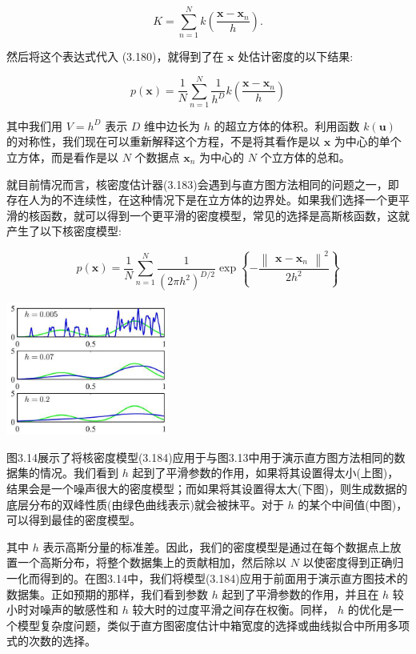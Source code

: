 \documentclass[10pt]{article}
\begin{document}
\[
K = \mathop{\sum }\limits_{{n = 1}}^{N}k\left( \frac{\mathbf{x} - {\mathbf{x}}_{n}}{h}\right) . \tag{3.182}
\]

然后将这个表达式代入 (3.180)，就得到了在 \(\mathbf{x}\) 处估计密度的以下结果:

\[
p\left( \mathbf{x}\right)  = \frac{1}{N}\mathop{\sum }\limits_{{n = 1}}^{N}\frac{1}{{h}^{D}}k\left( \frac{\mathbf{x} - {\mathbf{x}}_{n}}{h}\right)  \tag{3.183}
\]

其中我们用 \(V = {h}^{D}\) 表示 \(D\) 维中边长为 \(h\) 的超立方体的体积。利用函数 \(k\left( \mathbf{u}\right)\) 的对称性，我们现在可以重新解释这个方程，不是将其看作是以 \(\mathbf{x}\) 为中心的单个立方体，而是看作是以 \(N\) 个数据点 \({\mathbf{x}}_{n}\) 为中心的 \(N\) 个立方体的总和。

就目前情况而言，核密度估计器(3.183)会遇到与直方图方法相同的问题之一，即存在人为的不连续性，在这种情况下是在立方体的边界处。如果我们选择一个更平滑的核函数，就可以得到一个更平滑的密度模型，常见的选择是高斯核函数，这就产生了以下核密度模型:

\[
p\left( \mathbf{x}\right)  = \frac{1}{N}\mathop{\sum }\limits_{{n = 1}}^{N}\frac{1}{{\left( 2\pi {h}^{2}\right) }^{D/2}}\exp \left\{  {-\frac{{\begin{Vmatrix}\mathbf{x} - {\mathbf{x}}_{n}\end{Vmatrix}}^{2}}{2{h}^{2}}}\right\}   \tag{3.184}
\]

\begin{center}
\includegraphics[max width=0.4\textwidth]{images/0194e279-9b28-703a-88f4-c3ac21e2010d_121_942_368_551_454_0.jpg}
\end{center}
\hspace*{3em} 

图3.14展示了将核密度模型(3.184)应用于与图3.13中用于演示直方图方法相同的数据集的情况。我们看到 \(h\) 起到了平滑参数的作用，如果将其设置得太小(上图)，结果会是一个噪声很大的密度模型；而如果将其设置得太大(下图)，则生成数据的底层分布的双峰性质(由绿色曲线表示)就会被抹平。对于 \(h\) 的某个中间值(中图)，可以得到最佳的密度模型。

其中 \(h\) 表示高斯分量的标准差。因此，我们的密度模型是通过在每个数据点上放置一个高斯分布，将整个数据集上的贡献相加，然后除以 \(N\) 以使密度得到正确归一化而得到的。在图3.14中，我们将模型(3.184)应用于前面用于演示直方图技术的数据集。正如预期的那样，我们看到参数 \(h\) 起到了平滑参数的作用，并且在 \(h\) 较小时对噪声的敏感性和 \(h\) 较大时的过度平滑之间存在权衡。同样， \(h\) 的优化是一个模型复杂度问题，类似于直方图密度估计中箱宽度的选择或曲线拟合中所用多项式的次数的选择。
\end{document}

